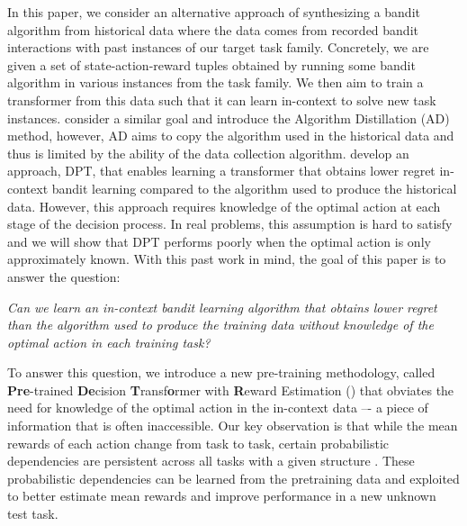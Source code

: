  In this paper, we consider an alternative approach of synthesizing a bandit algorithm from historical data where the data comes from recorded bandit interactions with past instances of our target task family.
% 
Concretely, we are given a set of state-action-reward tuples obtained by running some bandit algorithm in various instances from the task family.
% 
We then aim to train a transformer \citep{vaswani2017attention} from this data such that it can learn in-context to solve new task instances.
% 
\citet{laskin2022context} consider a similar goal and introduce the Algorithm Distillation (AD) method, however, AD aims to copy the algorithm used in the historical data and thus is limited by the ability of the data collection algorithm.
% 
\citet{lee2023supervised} develop an approach, DPT, that enables learning a transformer that obtains lower regret in-context bandit learning compared to the algorithm used to produce the historical data. However, this approach requires knowledge of the optimal action at each stage of the decision process. In real problems, this assumption is hard to satisfy and we will show that DPT performs poorly when the optimal action is only approximately known.
% 
With this past work in mind, the goal of this paper is to answer the question:
\begin{tcolorbox}
\begin{center}
    \textit{Can we learn an in-context bandit learning algorithm that obtains lower regret than the algorithm used to produce the training data without knowledge of the optimal action in each training task?}
\end{center}
\end{tcolorbox}    
To answer this question, we introduce a new pre-training methodology, called \textbf{Pre}-trained \textbf{De}cision \textbf{T}ransf\textbf{o}rmer with \textbf{R}eward Estimation (\pred) that obviates the need for knowledge of the optimal action in the in-context data –- a piece of information that is often inaccessible. 
%
%
Our key observation is that while the mean rewards of each action change from task to task, certain probabilistic dependencies are persistent across all tasks with a given structure \citep{yang2020impact, yang2022nearly, mukherjee2023multi}. These probabilistic dependencies can be learned from the pretraining data and exploited to better estimate mean rewards and improve performance in a new unknown test task.  
